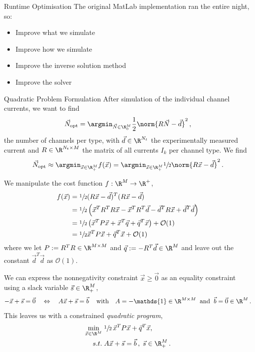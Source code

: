 \documentclass[aspectratio=169, hyperref={colorlinks=true}]{beamer}
\begin{document}
  \begin{frame}{Runtime Optimisation}
    The original MatLab implementation ran the entire night, so:
    \begin{itemize}
      \item Improve what we simulate
      \item Improve how we simulate
      \item Improve the inverse solution method
      \item Improve the solver
    \end{itemize}
  \end{frame}

  \begin{frame}[allowframebreaks]{Quadratic Problem Formulation}
    After simulation of the individual channel currents, we want to find
    \begin{equation*}
      \vec{N}_{\rm opt} = \argmin_{\vec{N} \in \N_0^M} \frac{1}{2} \norm{R \vec{N} - \vec{d}}^2\,,
      \label{eq:minimization}
    \end{equation*}
    the number of channels per type, with $\vec{d} \in \R^{N_t}$ the experimentally measured current and $R \in \R^{N_t \times M}$ the matrix of all currents $I_k$ per channel type.
    We find
    $$\vec{N}_{\rm opt} \approx \argmin_{\vec{x} \in \R_+^M} f(\vec{x}) = \argmin_{\vec{x} \in \R_+^M} \sfrac{1}{2} \norm{R \vec{x} - \vec{d}}^2\,.$$

    We manipulate the cost function $f: \R^M \to \R^+$,
    \begin{align*}
      f(\vec{x}) & = \sfrac{1}{2} (R \vec{x} - \vec{d})^T (R \vec{x} - \vec{d})                                                          \\
                 & = \sfrac{1}{2} \left(\vec{x}^T R^T R \vec{x} - \vec{x}^T R^T \vec{d} - \vec{d}^T R \vec{x} + \vec{d}^T \vec{d}\right) \\
                 & = \sfrac{1}{2} \left(\vec{x}^T P \vec{x} + \vec{x}^T \vec{q} + \vec{q}^T \vec{x}\right) + \mathcal{O}(1)              \\
                 & = \sfrac{1}{2} \vec{x}^T P \vec{x} + \vec{q}^T \vec{x} + \mathcal{O}(1)
    \end{align*}
    where we let $P := R^T R \in \R^{M \times M}$ and $\vec{q} := -R^T \vec{d} \in \R^M$ and leave out the constant $\vec{d}^T \vec{d}$ as $\mathcal{O}(1)$.

    We can express the nonnegativity constraint $\vec{x} \ge \vec{0}$ as an equality constraint using a slack variable $\vec{s} \in \R_+^M$,
    $$-\vec{x} + \vec{s} = \vec{0} \quad\Leftrightarrow\quad A \vec{x} + \vec{s} = \vec{b}\,\quad \text{with}\quad A = -\mathds{1} \in \R^{M \times M} \;\;\text{and}\;\; \vec{b} = \vec{0} \in \R^M\,.$$
    This leaves us with a constrained \textit{quadratic program},
    \begin{align*}
      \min_{\vec{x} \in \R^M}\; & \sfrac{1}{2}\, \vec{x}^T P \vec{x} + \vec{q}^T \vec{x},  \\
      s.t.\;                    & A \vec{x} + \vec{s} = \vec{b}\,,\; \vec{s} \in \R_+^M\,.
    \end{align*}


\end{frame}
\end{document}
